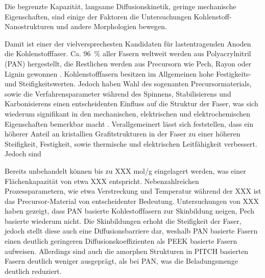 

Die begrenzte Kapazität, langsame Diffusionskinetik, geringe mechanische Eigenschaften, sind einige der Faktoren die Untersuchungen Kohlenstoff-Nanostrukturen und andere Morphologien bewegen.

Damit ist einer der vielversprechesten Kandidaten für lastentragenden Anoden die Kohlenstofffaser. Ca. 96~\% aller Fasern weltweit werden aus Polyacrylnitril (PAN) hergestellt, die Restlichen werden aus Precursorn wie Pech, Rayon oder Lignin gewonnen \cite{Das2016}. Kohlenstofffasern besitzen im Allgemeinen hohe Festigkeits- und Steifigkeitswerten. Jedoch haben Wahl des sogenanten Precursormaterials, sowie die Verfahrensparameter während des Spinnens, Stabilisierens und Karbonisierens einen entscheidenten Einfluss auf die Struktur der Faser, was sich wiederum signifikant in den mechanischen, elektrischen und elektrochemischen Eigenschaften bemerkbar macht \cite{Newcomb2015}.
Verallgemeinert lässt sich feststellen, dass ein höherer Anteil an kristallien Grafitstrukturen in der Faser zu einer höheren Steifigkeit, Festigkeit, sowie thermische und elektrischen Leitfähigkeit verbessert. Jedoch sind 


Bereits unbehandelt können bis zu XXX mol/g eingelagert werden, was einer Flächenkapazität von etwa XXX entspricht. Nebenzahlreichen Prozessparametern, wie etwa Verstreckung und Temperatur während der XXX ist das Precursor-Material von entscheidenter Bedeutung. Untersuchungen von XXX haben gezeigt, dass PAN basierte Kohlestofffasern zur Skinbildung neigen, Pech basierte wiederum nicht. Die Skinbildungen erhoht die Steifigkeit der Faser, jedoch stellt diese auch eine Diffusionsbarriere dar, weshalb PAN basierte Fasern einen deutlich geringeren Diffusionskoeffizienten als PEEK basierte Fasern aufweisen. Allerdings sind auch die amorphen Strukturen in PITCH basierten Fasern deutlich weniger ausgeprägt, als bei PAN, was die Beladungsmenge deutlich reduziert.


